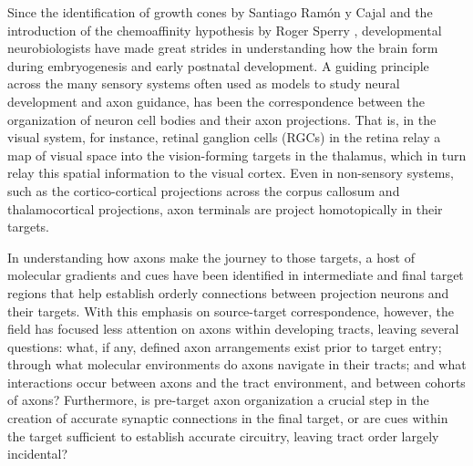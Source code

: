 Since the identification of growth cones by Santiago Ram\'on y Cajal and the introduction of the chemoaffinity hypothesis by Roger Sperry \cite{sperry1963chemoaffinity}, developmental neurobiologists have made great strides in understanding how the brain form during embryogenesis and early postnatal development.
A guiding principle across the many sensory systems often used as models to study neural development and axon guidance, has been the correspondence between the organization of neuron cell bodies and their axon projections.
That is, in the visual system, for instance, retinal ganglion cells (RGCs) in the retina relay a map of visual space into the vision-forming targets in the thalamus, which in turn relay this spatial information to the visual cortex.
Even in non-sensory systems, such as the cortico-cortical projections across the corpus callosum and thalamocortical projections, axon terminals are project homotopically in their targets. 

In understanding how axons make the journey to those targets, a host of molecular gradients and cues have been identified in intermediate and final target regions that help establish orderly connections between projection neurons and their targets.
With this emphasis on source-target correspondence, however, the field has focused less attention on axons within developing tracts, leaving several questions: what, if any, defined axon arrangements exist prior to target entry; through what molecular environments do axons navigate in their tracts; and what interactions occur between axons and the tract environment, and between cohorts of axons?
Furthermore, is pre-target axon organization a crucial step in the creation of accurate synaptic connections in the final target, or are cues within the target sufficient to establish accurate circuitry, leaving tract order largely incidental?

